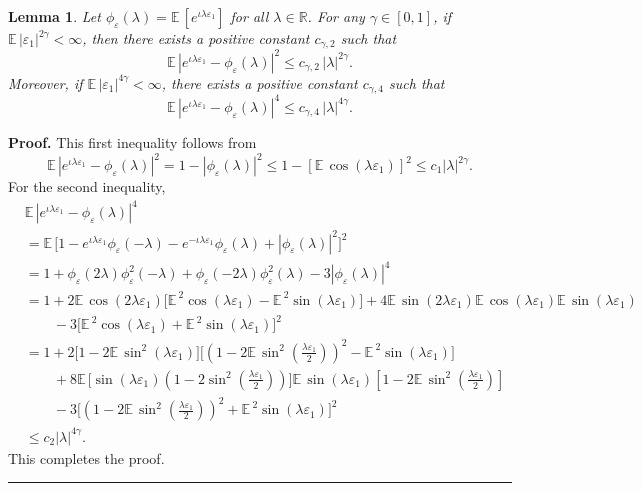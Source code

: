 \documentclass[11pt]{article}
\newtheorem{lemma}{Lemma}[section]
\newenvironment{proof}[1][Proof]{\textbf{#1.} }{\
\rule{0.5em}{0.5em}}
\def\R{{\mathbb R}}
\def\E{{{\mathbb E}\,}}
\begin{document}
\begin{lemma} \label{lma} Let $\phi_{\varepsilon}(\lambda)=\E[e^{\iota \lambda \varepsilon_1}]$ for all $\lambda\in\R$.  For any $\gamma\in[0,1]$, if $\E|\varepsilon_1|^{2\gamma}<\infty$, then there exists a positive constant $c_{\gamma,2}$ such that 
\[
\E |e^{\iota \lambda \varepsilon_1}-\phi_{\varepsilon}(\lambda)|^2\leq c_{\gamma,2}\, |\lambda|^{2\gamma}.
\]
Moreover, if $\E|\varepsilon_1|^{4\gamma}<\infty$, there exists a positive constant $c_{\gamma,4}$ such that
\[
\E |e^{\iota \lambda  \varepsilon_1}-\phi_{\varepsilon}(\lambda)|^4\leq c_{\gamma,4}\, |\lambda|^{4\gamma}.
\]
\end{lemma}
\begin{proof} This first inequality follows from 
\[
\E  |e^{\iota \lambda \varepsilon_1}-\phi_{\varepsilon}(\lambda)|^2
=1-|\phi_{\varepsilon}(\lambda)|^2
\leq 1-[\E\cos(\lambda \varepsilon_1)]^2\leq c_1|\lambda|^{2\gamma}.
\]
For the second inequality,
\begin{align*}
&\E |e^{\iota \lambda \varepsilon_1}-\phi_{\varepsilon}(\lambda)|^4\\
&=\E \big[ 1-e^{\iota \lambda  \varepsilon_1} \phi_{\varepsilon}(-\lambda)-e^{-\iota \lambda  \varepsilon_1} \phi_{\varepsilon}(\lambda)+|\phi_{\varepsilon}(\lambda)|^2\big]^2\\
&=1+\phi_{\varepsilon}(2\lambda)\phi^2_{\varepsilon}(-\lambda)+\phi_{\varepsilon}(-2\lambda)\phi^2_{\varepsilon}(\lambda)-3|\phi_{\varepsilon}(\lambda)|^4\\
&=1+ 2 \E\cos(2\lambda \varepsilon_1) \big[\E^2\cos(\lambda \varepsilon_1)-\E^2\sin(\lambda  \varepsilon_1) \big]+4\E\sin(2\lambda  \varepsilon_1)\E\cos(\lambda  \varepsilon_1)\E\sin(\lambda  \varepsilon_1)\\
&\qquad -3\big[\E^2\cos(\lambda \varepsilon_1)+\E^2\sin(\lambda \varepsilon_1)\big]^2\\
&=1+ 2 \big[1-2\E\sin^2(\lambda \varepsilon_1)\big] \big[(1-2\E\sin^2(\frac{\lambda \varepsilon_1}{2}))^2-\E^2\sin(\lambda \varepsilon_1) \big]\\
&\qquad +8\E\big[\sin(\lambda \varepsilon_1)(1-2\sin^2(\frac{\lambda \varepsilon_1}{2}))\big]\E\sin(\lambda \varepsilon_1)[1-2\E\sin^2(\frac{\lambda \varepsilon_1}{2})]\\
&\qquad -3\big[(1-2\E\sin^2(\frac{\lambda \varepsilon_1}{2}))^2+\E^2\sin(\lambda  \varepsilon_1)\big]^2\\
&\leq c_2 |\lambda|^{4\gamma}.
\end{align*}
This completes the proof.
\end{proof}
\end{document}
